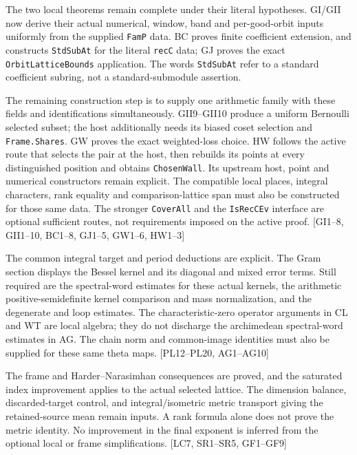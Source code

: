 \documentclass[11pt,a4paper]{article}
\numberwithin{equation}{section}
\theoremstyle{remark}\newtheorem{remark}[theorem]{Remark}
\begin{document}
\begin{description}[style=nextline]
\item[Construct one family realizing all the selected data.]
The two local theorems remain complete under their literal hypotheses.
GI/GII now derive their actual numerical, window, band and per-good-orbit
inputs uniformly from the supplied \texttt{FamP} data. BC proves finite
coefficient extension, and constructs \texttt{StdSubAt} for the literal
\texttt{recC} data; GJ proves the exact \texttt{OrbitLatticeBounds}
application. The words \texttt{StdSubAt} refer to a standard coefficient
subring, not a standard-submodule assertion.

The remaining construction step is to supply one arithmetic family
with these fields and identifications simultaneously. GII9--GII10
produce a uniform Bernoulli selected subset; the host additionally
needs its biased coset selection and \texttt{Frame.Shares}.
GW proves the exact weighted-loss choice. HW follows the active
route that selects the pair at the host, then rebuilds its points at
every distinguished position and obtains \texttt{ChosenWall}.
Its upstream host, point and numerical constructors remain explicit.
The compatible local places, integral characters, rank equality and
comparison-lattice span must also be constructed for those same data.
The stronger \texttt{CoverAll} and the \texttt{IsRecCEv} interface are
optional sufficient routes, not requirements imposed on the active proof.
\textsf{[GI1--8, GII1--10, BC1--8, GJ1--5, GW1--6, HW1--3]}

\item[Theta identities, spectral estimates, and arithmetic kernel normalization.]
The common integral target and period deductions are explicit. The Gram section displays the Bessel kernel and its diagonal and mixed error terms. Still required are the spectral-word estimates for these actual kernels, the arithmetic positive-semidefinite kernel comparison and mass normalization, and the degenerate and loop estimates. The characteristic-zero operator arguments in CL and WT are local algebra; they do not discharge the archimedean spectral-word estimates in AG. The chain norm and common-image identities must also be supplied for these same theta maps. \textsf{[PL12--PL20, AG1--AG10]}

\item[Actual dimensions, metrics, and discarded target directions.]
The frame and Harder--Narasimhan consequences are proved, and the saturated index improvement applies to the actual selected lattice. The dimension balance, discarded-target control, and integral/isometric metric transport giving the retained-source mean remain inputs. A rank formula alone does not prove the metric identity. No improvement in the final exponent is inferred from the optional local or frame simplifications. \textsf{[LC7, SR1--SR5, GF1--GF9]}


\end{description}
\end{document}
